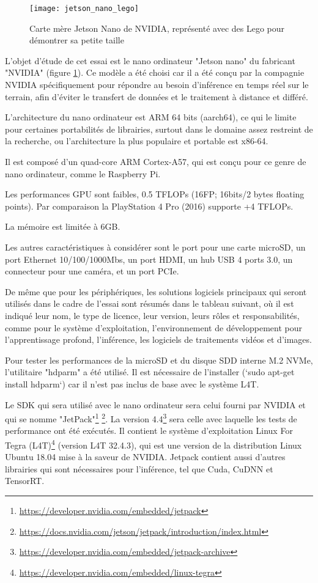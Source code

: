 ﻿
\begin{figure}[H]
    \centering
    \texttt{[image: jetson\_nano\_lego]}
    \caption[Carte mère Jetson Nano de NVIDIA]{Carte mère Jetson Nano de NVIDIA, représenté avec des Lego pour démontrer sa petite taille}
    \label{fig:jetson_nano_lego}
\end{figure}
\par L'objet d'étude de cet essai est le nano ordinateur "Jetson nano" du fabricant "NVIDIA" (figure \ref{fig:jetson_nano_lego}). Ce modèle a été choisi car il a été conçu par la compagnie NVIDIA spécifiquement pour répondre au besoin d'inférence en temps réel sur le terrain, afin d'éviter le transfert de données et le traitement à distance et différé. 
\par L'architecture du nano ordinateur est ARM 64 bits (aarch64), ce qui le limite pour certaines portabilités de librairies, surtout dans le domaine assez restreint de la recherche, ou l'architecture la plus populaire et portable est x86-64. 
\par Il est composé d'un quad-core ARM Cortex-A57, qui est conçu pour ce genre de nano ordinateur, comme le Raspberry Pi.
\par Les performances GPU sont faibles, 0.5 TFLOPs (16FP; 16bits/2 bytes floating points). Par comparaison la PlayStation 4 Pro (2016) supporte +4 TFLOPs. 
\par La mémoire est limitée à 6GB. 
\par Les autres caractéristiques à considérer sont le port pour une carte microSD, un port Ethernet 10/100/1000Mbs, un port HDMI, un hub USB 4 ports 3.0, un connecteur pour une caméra, et un port PCIe.
\par De même que pour les périphériques, les solutions logiciels principaux qui seront utilisés dans le cadre de l'essai sont résumés dans le tableau suivant, où il est indiqué leur nom, le type de licence, leur version, leurs rôles et responsabilités, comme pour le système d'exploitation, l'environnement de développement pour l'apprentissage profond, l'inférence, les logiciels de traitements vidéos et d'images. 
\par Pour tester les performances de la microSD et du disque SDD interne M.2 NVMe, l'utilitaire "hdparm" a été utilisé. Il est nécessaire de l'installer (`sudo apt-get install hdparm`) car il n'est pas inclus de base avec le système L4T.
\par Le SDK qui sera utilisé avec le nano ordinateur sera celui fourni par NVIDIA et qui se nomme "JetPack"\footnote{\url{https://developer.nvidia.com/embedded/jetpack}} \footnote{\url{https://docs.nvidia.com/jetson/jetpack/introduction/index.html}}. La version 4.4\footnote{\url{https://developer.nvidia.com/embedded/jetpack-archive}} sera celle avec laquelle les tests de performance ont été exécutés. Il contient le système d'exploitation Linux For Tegra (L4T)\footnote{\url{https://developer.nvidia.com/embedded/linux-tegra}} (version L4T 32.4.3), qui est une version de la distribution Linux Ubuntu 18.04 mise à la saveur de NVIDIA. Jetpack contient aussi d'autres librairies qui sont nécessaires pour l'inférence, tel que Cuda, CuDNN et TensorRT.
